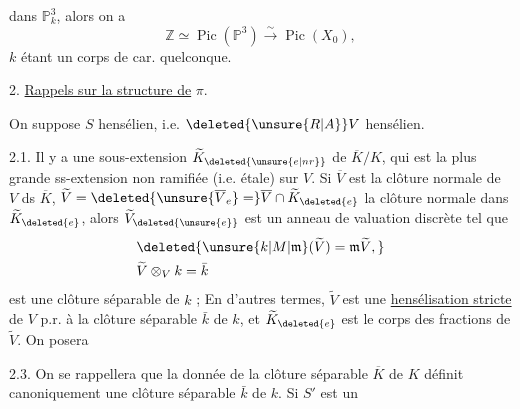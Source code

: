 dans \(\mathbb P^3_k\), alors on a
\[
\mathbb Z\simeq\operatorname{Pic}(\mathbb P^3)\xrightarrow{\sim}\operatorname{Pic}(X_0),
\]
\(k\) étant un corps de car. quelconque.

2. \uline{Rappels sur la structure de} \(\pi\).

On suppose \(S\) hensélien, i.e. \(\deleted{\unsure{R|A}}V\) hensélien.

2.1. Il y a une sous-extension \(\widetilde K_{\deleted{\unsure{e|nr}}}\) de \(\overline K/K\), qui est la plus grande ss-extension non ramifiée (i.e. étale)  sur \(V\). Si  \(\overline V\) est la clôture normale de \(V\) ds \(\overline K\), \(\widetilde V=\deleted{\unsure{\overline V_e}=}\overline V\cap\widetilde K_{\deleted{e}}\) la clôture normale dans \(\widetilde K_{\deleted{e}}\), alors \(\widetilde V_{\deleted{\unsure{e}}}\) est un anneau de valuation discrète tel que
\[
\begin{aligned}
&\deleted{\unsure{k|M|\mathfrak m}(\widetilde V)=\mathfrak m\widetilde V,}\\
&\widetilde V\otimes_V k=\bar k
\end{aligned}
\]
est une  clôture séparable de \(k\) ; En d'autres termes, \(\widetilde V\) est une \uline{hensélisation stricte} de \(V\) p.r. à  la  clôture séparable \(\bar k\) de \(k\), et \(\widetilde K_{\deleted{e}}\) est le corps des fractions de \(\widetilde V\). On posera 

\margin{\(\circ\mathrel{-}\)} 2.3. On se rappellera que  la donnée de la clôture séparable \(\overline K\) de \(K\) définit canoniquement une clôture séparable \(\bar k\) de \(k\).  Si \(S'\) est un

